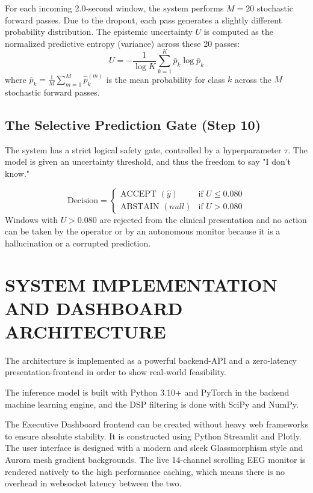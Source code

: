 \documentclass[conference,a4paper]{IEEEtran}
\begin{document}
For each incoming 2.0-second window, the system performs $M = 20$ stochastic forward passes. Due to the dropout, each pass generates a slightly different probability distribution. The epistemic uncertainty $U$ is computed as the normalized predictive entropy (variance) across these 20 passes:
\begin{equation}
U = - \frac{1}{\log K} \sum_{k=1}^K \bar{p}_k \log \bar{p}_k
\end{equation}
where $\bar{p}_k = \frac{1}{M} \sum_{m=1}^M \hat{p}_{k}^{(m)}$ is the mean probability for class $k$ across the $M$ stochastic forward passes.

\subsection{The Selective Prediction Gate (Step 10)}
The system has a strict logical safety gate, controlled by a hyperparameter $\tau$. The model is given an uncertainty threshold, and thus the freedom to say "I don't know."

\begin{equation}
\text{Decision} = 
\begin{cases} 
\text{ACCEPT } (\hat{y}) & \text{if } U \leq 0.080 \\
\text{ABSTAIN } (null) & \text{if } U > 0.080 
\end{cases}
\end{equation}
Windows with $U > 0.080$ are rejected from the clinical presentation and no action can be taken by the operator or by an autonomous monitor because it is a hallucination or a corrupted prediction.

\section{SYSTEM IMPLEMENTATION AND DASHBOARD ARCHITECTURE}
The architecture is implemented as a powerful backend-API and a zero-latency presentation-frontend in order to show real-world feasibility.  

The inference model is built with Python 3.10+ and PyTorch in the backend machine learning engine, and the DSP filtering is done with SciPy and NumPy.

The Executive Dashboard frontend can be created without heavy web frameworks to ensure absolute stability. It is constructed using Python Streamlit and Plotly. The user interface is designed with a modern and sleek Glassmorphism style and Aurora mesh gradient backgrounds. The live 14-channel scrolling EEG monitor is rendered natively to the high performance caching, which means there is no overhead in websocket latency between the two.
\end{document}
